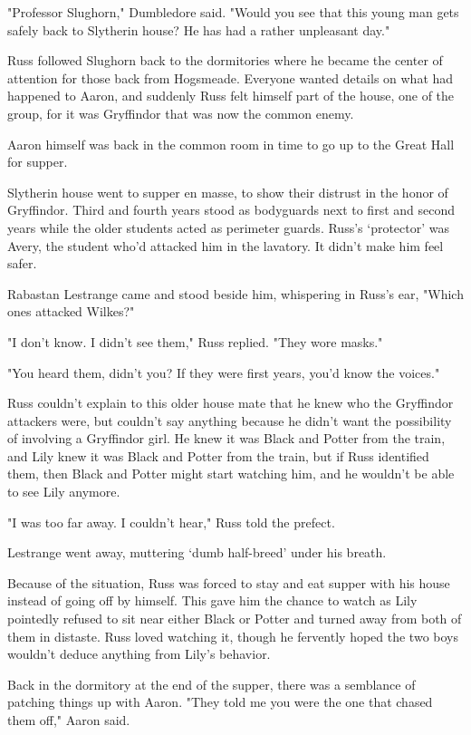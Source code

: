 "Professor Slughorn," Dumbledore said. "Would you see that this young man gets safely back to Slytherin house? He has had a rather unpleasant day."

Russ followed Slughorn back to the dormitories where he became the center of attention for those back from Hogsmeade. Everyone wanted details on what had happened to Aaron, and suddenly Russ felt himself part of the house, one of the group, for it was Gryffindor that was now the common enemy.

Aaron himself was back in the common room in time to go up to the Great Hall for supper.

Slytherin house went to supper en masse, to show their distrust in the honor of Gryffindor. Third and fourth years stood as bodyguards next to first and second years while the older students acted as perimeter guards. Russ's `protector' was Avery, the student who'd attacked him in the lavatory. It didn't make him feel safer.

Rabastan Lestrange came and stood beside him, whispering in Russ's ear, "Which ones attacked Wilkes?"

"I don't{\el} know. I didn't{\el} see them," Russ replied. "They w{\el}ore masks."

"You heard them, didn't you? If they were first years, you'd know the voices."

Russ couldn't explain to this older house mate that he knew who the Gryffindor attackers were, but couldn't say anything because he didn't want the possibility of involving a Gryffindor girl. He knew it was Black and Potter from the train, and Lily knew it was Black and Potter from the train, but if Russ identified them, then Black and Potter might start watching him, and he wouldn't be able to see Lily anymore.

"I was{\el} too far{\el} away. I couldn't{\el} hear," Russ told the prefect.

Lestrange went away, muttering `dumb half-breed' under his breath.

Because of the situation, Russ was forced to stay and eat supper with his house instead of going off by himself. This gave him the chance to watch as Lily pointedly refused to sit near either Black or Potter and turned away from both of them in distaste. Russ loved watching it, though he fervently hoped the two boys wouldn't deduce anything from Lily's behavior.

Back in the dormitory at the end of the supper, there was a semblance of patching things up with Aaron. "They told me you were the one that chased them off," Aaron said.

